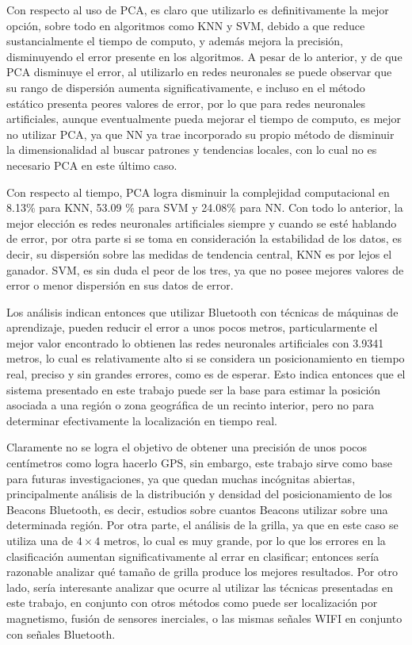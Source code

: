 Con respecto al uso de PCA, es claro que utilizarlo es definitivamente la mejor opción, sobre todo en algoritmos como KNN y SVM, debido a que reduce sustancialmente el tiempo de computo, y además mejora la precisión, disminuyendo el error presente en los algoritmos. A pesar de lo anterior, y de que PCA disminuye el error, al utilizarlo en redes neuronales se puede observar que su rango de dispersión aumenta significativamente, e incluso en el método estático presenta peores valores de error, por lo que para redes neuronales artificiales, aunque eventualmente pueda mejorar el tiempo de computo, es mejor no utilizar PCA, ya que  NN ya trae incorporado su propio método de disminuir la dimensionalidad al buscar patrones y tendencias locales, con lo cual no es necesario PCA en este último caso.

Con respecto al tiempo, PCA logra disminuir la complejidad computacional en 8.13\% para KNN, 53.09 \% para SVM y 24.08\% para NN. Con todo lo anterior, la mejor elección es redes neuronales artificiales siempre y cuando se esté hablando de error, por otra parte si se toma en consideración la estabilidad de los datos, es decir, su dispersión sobre las medidas de tendencia central, KNN es por lejos el ganador. SVM, es sin duda el peor de los tres, ya que no posee mejores valores de error o menor dispersión en sus datos de error.

Los análisis indican entonces que utilizar Bluetooth con técnicas de máquinas de aprendizaje, pueden reducir el error a unos pocos metros, particularmente el mejor valor encontrado lo obtienen las redes neuronales artificiales con 3.9341 metros, lo cual es relativamente alto si se considera un posicionamiento en tiempo real, preciso y sin grandes errores, como es de esperar. Esto indica entonces que el sistema presentado en este trabajo puede ser la base para estimar la posición asociada a una región o zona geográfica de un recinto interior, pero no para determinar efectivamente la localización en tiempo real.

Claramente no se logra el objetivo de obtener una precisión de unos pocos centímetros como logra hacerlo GPS, sin embargo, este trabajo sirve como base para futuras investigaciones, ya que quedan muchas incógnitas abiertas, principalmente análisis de la distribución y densidad del posicionamiento de los Beacons Bluetooth, es decir, estudios sobre cuantos Beacons utilizar sobre una determinada región. Por otra parte, el análisis de la grilla, ya que en este caso se utiliza una de $ 4\times 4$ metros, lo cual es muy grande, por lo que los errores en la clasificación aumentan significativamente al errar en clasificar; entonces sería razonable analizar qué tamaño de grilla produce los mejores resultados. Por otro lado, sería interesante analizar que ocurre al utilizar las técnicas presentadas en este trabajo, en conjunto con otros métodos como puede ser localización por magnetismo, fusión de sensores inerciales, o las mismas señales WIFI en conjunto con señales Bluetooth.

